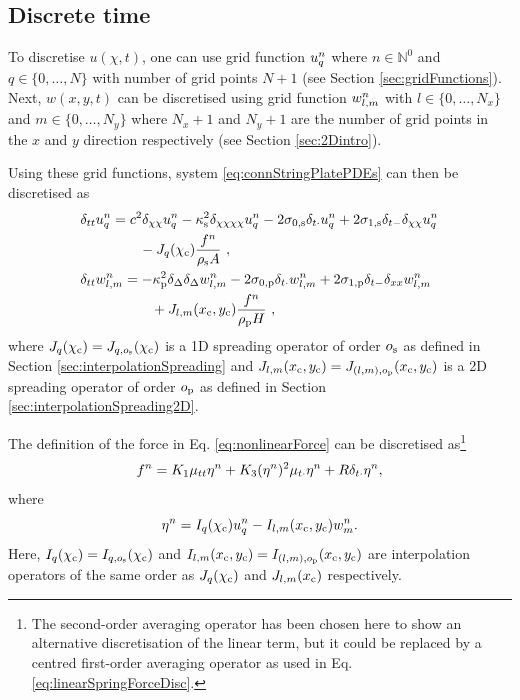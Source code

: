 \subsection{Discrete time}
To discretise $u(\chi, t)$, one can use grid function $u_q^n$ where $n\in\mathbb{N}^0$ and $q\in\{0, \hdots, N\}$ with number of grid points $N+1$ (see Section \ref{sec:gridFunctions}). Next, $w(x, y, t)$ can be discretised using grid function $w_{l,m}^n$ with $l \in \{0, \hdots, N_x\}$ and $m \in \{0, \hdots, N_y\}$ where $N_x+1$ and $N_y+1$ are the number of grid points in the $x$ and $y$ direction respectively (see Section \ref{sec:2Dintro}). 

Using these grid functions, system \eqref{eq:connStringPlatePDEs} can then be discretised as
\begin{align}\label{eq:connStringPlateFDSs}
    &\begin{aligned}
        \dtt \uqn &= c^2 \dcc \uqn - \kappa_\stxt^2 \dcccc \uqn - 2\szX[\stxt]\dtd \uqn + 2\soX[\stxt] \dtm\dcc \uqn \\
        &\qquad - J_q(\chi_\ctxt)\frac{f^n}{\rho_\stxt A}\ ,
    \end{aligned}\\
    &\begin{aligned}
        \dtt \wlmn &= -\kappa_\ptxt^2\dDelta\dDelta \wlmn - 2\szX[\ptxt]\dtd \wlmn + 2\soX[\ptxt] \dtm\dxx \wlmn \\
        &\qquad + J_{l, m}(x_\ctxt, y_\ctxt)\frac{f^n}{\rho_\ptxt H}\ ,
    \end{aligned}
\end{align}
where $J_q(\chi_{\text{c}}) = J_{q, o_{\text{s}}} (\chi_{\text{c}})$ is a 1D spreading operator of order $o_{\text{s}}$ as defined in Section \ref{sec:interpolationSpreading} and $J_{l, m}(x_{\text{c}}, y_{\text{c}}) = J_{(l, m), o_{\text{p}}}(x_{\text{c}}, y_{\text{c}})$ is a 2D spreading operator of order $o_{\text{p}}$ as defined in Section \ref{sec:interpolationSpreading2D}. 

The definition of the force in Eq. \eqref{eq:nonlinearForce} can be discretised as\footnote{The second-order averaging operator has been chosen here to show an alternative discretisation of the linear term, but it could be replaced by a centred first-order averaging operator as used in Eq. \eqref{eq:linearSpringForceDisc}.}
\begin{equation}\label{eq:discForceStringPlate}
    f^n = K_1\mu_{tt}\eta^n+K_3(\eta^n)^2\mu_{t\cdot}\eta^n+R\delta_{t\cdot}\eta^n,
\end{equation}
where
\begin{equation}\label{eq:discEtaStringPlate}
    \eta^n = I_q(\chi_{\text{c}})u_q^n - I_{l, m}(x_{\text{c}}, y_{\text{c}})w_m^n.
\end{equation}
Here, $I_q(\chi_{\text{c}}) = I_{q, o_{\text{s}}} (\chi_{\text{c}})$ and $I_{l, m}(x_{\text{c}}, y_{\text{c}}) = I_{(l, m), o_{\text{p}}}(x_{\text{c}}, y_{\text{c}})$ are interpolation operators of the same order as $J_q(\chi_{\text{c}})$ and $J_{l,m}(x_{\text{c}})$ respectively. 


